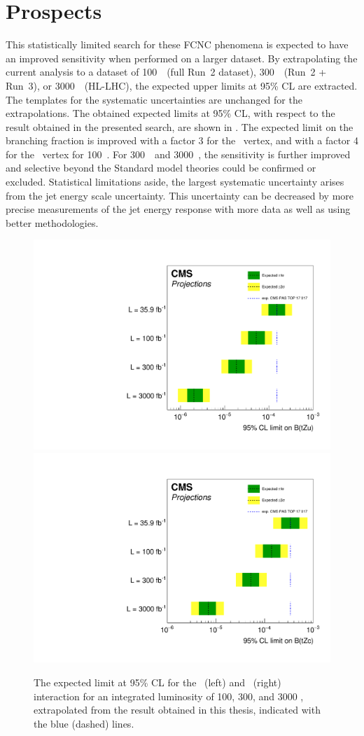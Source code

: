 \section{Prospects}
This statistically limited search for these FCNC phenomena is expected to have an improved sensitivity when performed on a larger dataset. By extrapolating the current analysis to a dataset of 100~\fbinv\ (full Run~2 dataset), 300~\fbinv\ (Run~2 + Run~3), or 3000~\fbinv\ (HL-LHC), the expected upper limits at 95\% CL are  extracted. %
The templates for the systematic uncertainties are unchanged for the extrapolations. The obtained expected limits at 95\% CL, with respect to the result obtained in the presented search, are shown in .  The expected limit on the branching fraction is improved with a factor  3 for the \Zut\ vertex, and with a factor  4 for the \Zct\ vertex for 100~\fbinv. For 300~\fbinv\ and 3000~\fbinv, the sensitivity is further improved and selective beyond the Standard model theories could be confirmed or excluded. Statistical limitations aside, the largest systematic uncertainty arises from the jet energy scale uncertainty. This uncertainty can be decreased by more precise measurements of the jet energy response with more data as well as using better methodologies. %
\begin{figure}[htbp]
	\centering
	\includegraphics[width=0.49\linewidth]{7_Conclusion/Figures/TOP-17-017_limitsZutProj.pdf}
	\includegraphics[width=0.49\linewidth]{7_Conclusion/Figures/TOP-17-017_limitsZctproj.pdf}
	\caption{The expected limit at 95\% CL for the \Zut\ (left) and \Zct\ (right) interaction for an integrated luminosity of 100, 300, and 3000 \fbinv, extrapolated from the result obtained in this thesis, indicated with the blue (dashed) lines. }
	\label{fig:proj} %
\end{figure}



